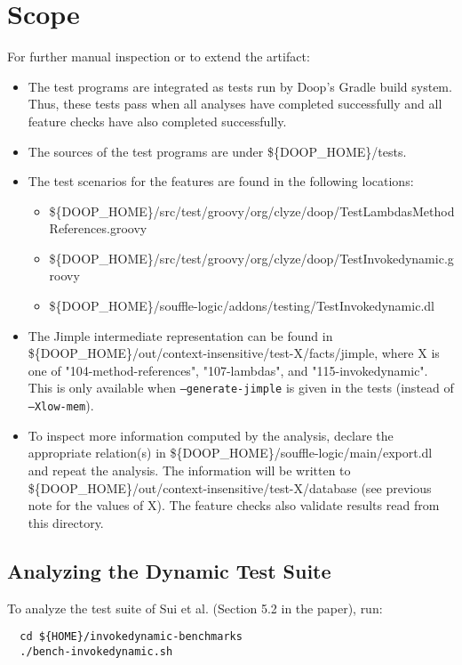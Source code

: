 \documentclass[a4paper,UKenglish]{darts-v2019}
\newenvironment{scope}{\section{Scope}}{}
\begin{document}
\begin{scope}
For further manual inspection or to extend the artifact:

\begin{itemize}
\item The test programs are integrated as tests run by Doop's Gradle
  build system. Thus, these tests pass when all analyses have
  completed successfully and all feature checks have also completed
  successfully.
\item The sources of the test programs are under
  \$\{DOOP\_HOME\}/tests.
\item The test scenarios for the features are found in the following
  locations:

  \begin{itemize}
  \item \$\{DOOP\_HOME\}/src/test/groovy/org/clyze/doop/TestLambdasMethodReferences.groovy
  \item \$\{DOOP\_HOME\}/src/test/groovy/org/clyze/doop/TestInvokedynamic.groovy
  \item \$\{DOOP\_HOME\}/souffle-logic/addons/testing/TestInvokedynamic.dl
  \end{itemize}

\item The Jimple intermediate representation can be found in
  \$\{DOOP\_HOME\}/out/context-insensitive/test-X/facts/jimple, where X
  is one of "104-method-references", "107-lambdas", and
  "115-invokedynamic". This is only available when
  \texttt{--generate-jimple} is given in the tests (instead of
  \texttt{--Xlow-mem}).
\item To inspect more information computed by the analysis, declare
  the appropriate relation(s) in
  \$\{DOOP\_HOME\}/souffle-logic/main/export.dl and repeat the
  analysis. The information will be written to
  \$\{DOOP\_HOME\}/out/context-insensitive/test-X/database (see
  previous note for the values of X). The feature checks also validate
  results read from this directory.
\end{itemize}

\subsection{Analyzing the Dynamic Test Suite}
\label{sec:dynamic}

To analyze the test suite of Sui et al. (Section 5.2 in the paper), run:

\begin{verbatim}
  cd ${HOME}/invokedynamic-benchmarks
  ./bench-invokedynamic.sh
\end{verbatim}


\end{scope}
\end{document}
